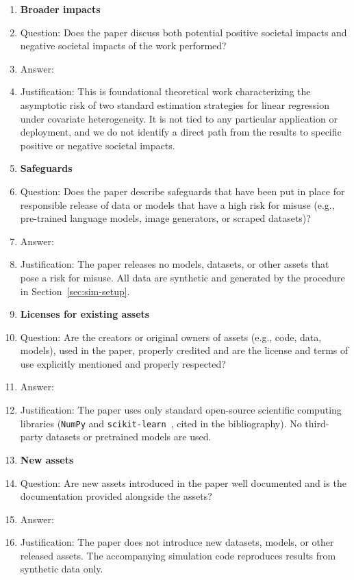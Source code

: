 \begin{enumerate}
\item {\bf Broader impacts}
    \item[] Question: Does the paper discuss both potential positive societal impacts and negative societal impacts of the work performed?
    \item[] Answer: \answerNA{} %
    \item[] Justification: This is foundational theoretical work characterizing the asymptotic risk of two standard estimation strategies for linear regression under covariate heterogeneity. It is not tied to any particular application or deployment, and we do not identify a direct path from the results to specific positive or negative societal impacts.
   
    
\item {\bf Safeguards}
    \item[] Question: Does the paper describe safeguards that have been put in place for responsible release of data or models that have a high risk for misuse (e.g., pre-trained language models, image generators, or scraped datasets)?
    \item[] Answer: \answerNA{} %
    \item[] Justification: The paper releases no models, datasets, or other assets that pose a risk for misuse. All data are synthetic and generated by the procedure in Section~\ref{sec:sim-setup}.
    

\item {\bf Licenses for existing assets}
    \item[] Question: Are the creators or original owners of assets (e.g., code, data, models), used in the paper, properly credited and are the license and terms of use explicitly mentioned and properly respected?
    \item[] Answer: \answerNA{} %
    \item[] Justification: The paper uses only standard open-source scientific computing libraries (\texttt{NumPy} and \texttt{scikit-learn}~\citep{pedregosa2011scikit}, cited in the bibliography). No third-party datasets or pretrained models are used.
   

\item {\bf New assets}
    \item[] Question: Are new assets introduced in the paper well documented and is the documentation provided alongside the assets?
    \item[] Answer: \answerNA{} %
    \item[] Justification: The paper does not introduce new datasets, models, or other released assets. The accompanying simulation code reproduces results from synthetic data only.
    

\end{enumerate}
